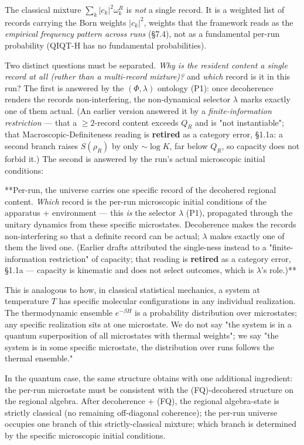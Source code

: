 \documentclass[11pt,a4paper]{article}
\begin{document}
The classical mixture $\sum_k |c_k|^2 \omega_k^R$ is \emph{not} a single record. It is a weighted list of records carrying the Born weights $|c_k|^2$, weights that the framework reads as the \emph{empirical frequency pattern across runs} (§7.4), not as a fundamental per-run probability (QIQT-H has no fundamental probabilities).

Two distinct questions must be separated. \emph{Why is the resident content a single record at all (rather than a multi-record mixture)?} and \emph{which} record is it in this run? The first is answered by the $(\Phi,\lambda)$ ontology (P1): once decoherence renders the records non-interfering, the non-dynamical selector $\lambda$ marks exactly one of them actual. (An earlier version answered it by a \emph{finite-information restriction} — that a $\ge 2$-record content exceeds $Q_R$ and is "not instantiable"; that Macroscopic-Definiteness reading is \textbf{retired} as a category error, §1.1a: a second branch raises $S(\rho_R)$ by only $\sim\!\log K$, far below $Q_R$, so capacity does not forbid it.) The second is answered by the run's actual microscopic initial conditions:

**Per-run, the universe carries one specific record of the decohered regional content. \emph{Which} record is the per-run microscopic initial conditions of the apparatus + environment — this \emph{is} the selector $\lambda$ (P1), propagated through the unitary dynamics from these specific microstates. Decoherence makes the records non-interfering so that a definite record can be actual; $\lambda$ makes exactly one of them the lived one. (Earlier drafts attributed the single-ness instead to a "finite-information restriction" of capacity; that reading is \textbf{retired} as a category error, §1.1a — capacity is kinematic and does not select outcomes, which is $\lambda$'s role.)**

This is analogous to how, in classical statistical mechanics, a system at temperature $T$ has specific molecular configurations in any individual realization. The thermodynamic ensemble $e^{-\beta H}$ is a probability distribution over microstates; any specific realization sits at one microstate. We do not say "the system is in a quantum superposition of all microstates with thermal weights"; we say "the system is in some specific microstate, the distribution over runs follows the thermal ensemble."

In the quantum case, the same structure obtains with one additional ingredient: the per-run microstate must be consistent with the (FQ)-decohered structure on the regional algebra. After decoherence + (FQ), the regional algebra-state is strictly classical (no remaining off-diagonal coherence); the per-run universe occupies one branch of this strictly-classical mixture; which branch is determined by the specific microscopic initial conditions.
\end{document}
